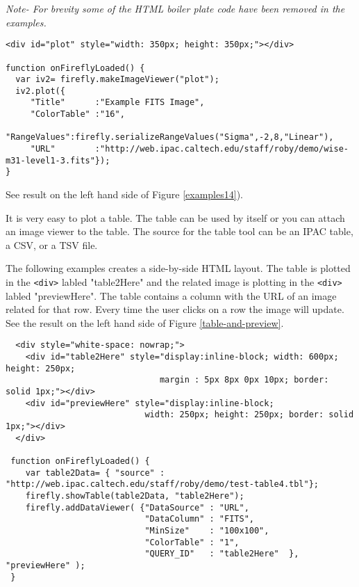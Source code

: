 \textit{Note- For brevity some of the HTML boiler plate code have been removed in the examples.}



\scriptsize
\begin{verbatim}
<div id="plot" style="width: 350px; height: 350px;"></div>

function onFireflyLoaded() {
  var iv2= firefly.makeImageViewer("plot");
  iv2.plot({   
     "Title"      :"Example FITS Image",
     "ColorTable" :"16",
     "RangeValues":firefly.serializeRangeValues("Sigma",-2,8,"Linear"),
     "URL"        :"http://web.ipac.caltech.edu/staff/roby/demo/wise-m31-level1-3.fits"});
}
\end{verbatim}
See result on the left hand side of Figure \ref{examples14}).
        
It is very easy to plot a table. The table can be used by itself or you can attach an image viewer to the table. The source for the table tool can be an IPAC table, a CSV, or a TSV file. 

The following examples creates a side-by-side HTML layout.  The table is plotted in the \scriptsize\texttt{<div>} \normalsize labled "table2Here" and the related image is plotting in the \scriptsize\texttt{<div>} \normalsize labled "previewHere". The table contains a column with the URL of an image related for that row. Every time the user clicks on a row the image will update. See the result on the left hand side of Figure \ref{table-and-preview}.

\scriptsize
\begin{verbatim}
  <div style="white-space: nowrap;">
    <div id="table2Here" style="display:inline-block; width: 600px; height: 250px; 
                               margin : 5px 8px 0px 10px; border: solid 1px;"></div>
    <div id="previewHere" style="display:inline-block;
                            width: 250px; height: 250px; border: solid 1px;"></div>
  </div>

 function onFireflyLoaded() {
    var table2Data= { "source" : "http://web.ipac.caltech.edu/staff/roby/demo/test-table4.tbl"};
    firefly.showTable(table2Data, "table2Here");
    firefly.addDataViewer( {"DataSource" : "URL",
                            "DataColumn" : "FITS",
                            "MinSize"    : "100x100",
                            "ColorTable" : "1",
                            "QUERY_ID"   : "table2Here"  }, "previewHere" );
 }
\end{verbatim}
\normalsize


